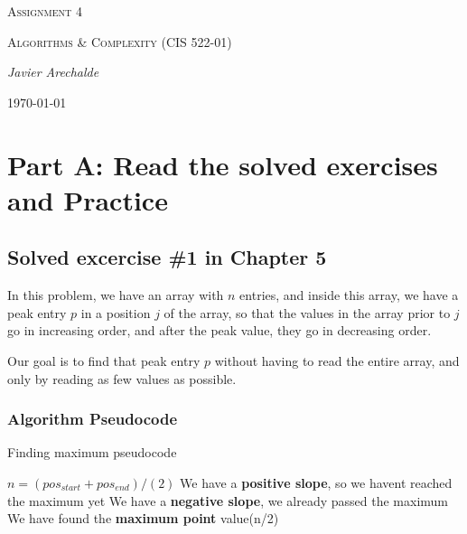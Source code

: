 \documentclass{article}
\begin{document}
\begin{titlepage}
	\centering
	{\scshape\LARGE Assignment 4\par}
	\vspace{1cm}
	{\scshape\Large Algorithms \& Complexity (CIS 522-01)\par}
	\vspace{1.5cm}
	{\Large\itshape Javier Arechalde\par}
	\vfill
	{\large \today\par}
\end{titlepage}

\section*{Part A: Read the solved exercises and Practice}

\subsection*{Solved excercise \#1 in Chapter 5}

In this problem, we have an array with $n$ entries, and inside this array, we have a peak entry $p$ in a position $j$ of the array, so that the values in the array prior to $j$ go in increasing order, and after the peak value, they go in decreasing order.

Our goal is to find that peak entry $p$ without having to read the entire array, and only by reading as few values as possible. 

\subsubsection*{Algorithm Pseudocode}

\begin{algorithm}[H]
\caption{Finding maximum pseudocode}
\begin{algorithmic}[1]
 \State $n = (pos_{start}+pos_{end})/(2)$
  \State We have a \textbf{positive slope}, so we havent reached the maximum yet
  \State {}
  \State We have a \textbf{negative slope}, we already passed the maximum
  \State {}
  \State We have found the \textbf{maximum point}
  \State \Return value(n/2)
 \EndIf
\EndFunction
\end{algorithmic}
\end{algorithm}
\end{document}
